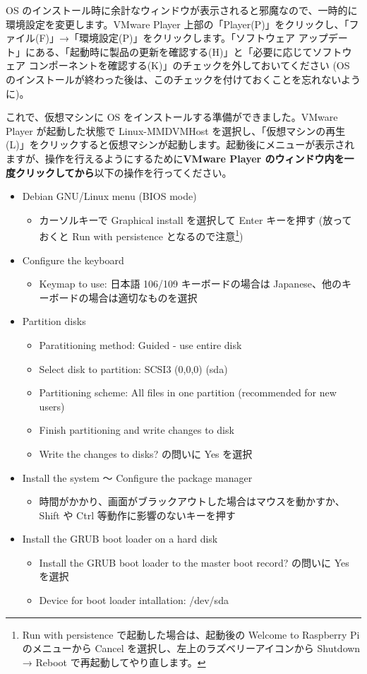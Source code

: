 \documentclass[a4j,oneside]{ujbook}
\begin{document}
OS のインストール時に余計なウィンドウが表示されると邪魔なので、一時的に環境設定を変更します。VMware Player 上部の「Player(P)」をクリックし、「ファイル(F)」→「環境設定(P)」をクリックします。「ソフトウェア アップデート」にある、「起動時に製品の更新を確認する(H)」と「必要に応じてソフトウェア コンポーネントを確認する(K)」のチェックを外しておいてください (OS のインストールが終わった後は、このチェックを付けておくことを忘れないように)。

これで、仮想マシンに OS をインストールする準備ができました。VMware Player が起動した状態で Linux-MMDVMHost を選択し、「仮想マシンの再生(L)」をクリックすると仮想マシンが起動します。起動後にメニューが表示されますが、操作を行えるようにするために\textbf{VMware Player のウィンドウ内を一度クリックしてから}以下の操作を行ってください。

\begin{itemize}
 \item Debian GNU/Linux menu (BIOS mode)
 \begin{itemize}
  \item カーソルキーで Graphical install を選択して Enter キーを押す (放っておくと Run with persistence となるので注意\footnote{Run with persistence で起動した場合は、起動後の Welcome to Raspberry Pi のメニューから Cancel を選択し、左上のラズベリーアイコンから Shutdown → Reboot で再起動してやり直します。})
 \end{itemize}
 \item Configure the keyboard
 \begin{itemize}
  \item Keymap to use: 日本語 106/109 キーボードの場合は Japanese、他のキーボードの場合は適切なものを選択
 \end{itemize}
 \item Partition disks
 \begin{itemize}
  \item Paratitioning method: Guided - use entire disk
  \item Select disk to partition: SCSI3 (0,0,0) (sda)
  \item Partitioning scheme: All files in one partition (recommended for new users)
  \item Finish partitioning and write changes to disk
  \item Write the changes to disks? の問いに Yes を選択
 \end{itemize}
 \item Install the system 〜 Configure the package manager
 \begin{itemize}
  \item 時間がかかり、画面がブラックアウトした場合はマウスを動かすか、 Shift や Ctrl 等動作に影響のないキーを押す
 \end{itemize}
 \item Install the GRUB boot loader on a hard disk
 \begin{itemize}
  \item Install the GRUB boot loader to the master boot record? の問いに Yes を選択
  \item Device for boot loader intallation: /dev/sda
 \end{itemize}
\end{itemize}
\end{document}
